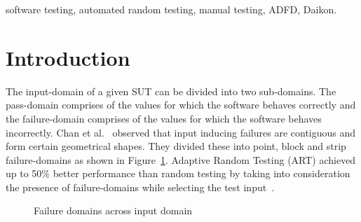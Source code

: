 \documentclass[conference]{IEEEtran}
\begin{document}
\begin{IEEEkeywords}
software testing, automated random testing, manual testing, ADFD, Daikon.
\end{IEEEkeywords}


\IEEEpeerreviewmaketitle




\section{Introduction}\label{sec:intro}

The input-domain of a given SUT can be divided into two sub-domains. The pass-domain comprises of the values for which the software behaves correctly and the failure-domain comprises of the values for which the software behaves incorrectly. Chan et al.~\cite{chan1996proportional} observed that input inducing failures are contiguous and form certain geometrical shapes. They divided these into point, block and strip failure-domains as shown in Figure~\ref{fig:patterns2}. Adaptive Random Testing (ART) achieved up to 50\% better performance than random testing by taking into consideration the presence of failure-domains while selecting the test input~\cite{Chen2008}.

\smallskip
\begin{figure} [H]
\centering
{}
\smallskip
\caption{Failure domains across input domain~\cite{chan1996proportional}}
\label{fig:patterns2}
\end{figure} 
\end{document}
